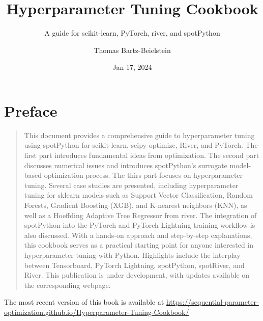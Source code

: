 \documentclass[
  letterpaper,
  DIV=11,
  numbers=noendperiod]{scrreprt}
\title{Hyperparameter Tuning Cookbook}
\subtitle{A guide for scikit-learn, PyTorch, river, and spotPython}
\author{Thomas Bartz-Beielstein}
\date{Jan 17, 2024}
\renewcommand*\contentsname{Table of contents}
\newcommand\contentsname{Table of contents}
\begin{document}
\maketitle

\renewcommand*\contentsname{Table of contents}
{
\hypersetup{linkcolor=}
\setcounter{tocdepth}{2}
\tableofcontents
}

\chapter*{Preface}\label{preface}


\begin{quote}
This document provides a comprehensive guide to hyperparameter tuning
using spotPython for scikit-learn, scipy-optimize, River, and PyTorch.
The first part introduces fundamental ideas from optimization. The
second part discusses numerical issues and introduces spotPython's
surrogate model-based optimization process. The thirs part focuses on
hyperparameter tuning. Several case studies are presented, including
hyperparameter tuning for sklearn models such as Support Vector
Classification, Random Forests, Gradient Boosting (XGB), and K-nearest
neighbors (KNN), as well as a Hoeffding Adaptive Tree Regressor from
river. The integration of spotPython into the PyTorch and PyTorch
Lightning training workflow is also discussed. With a hands-on approach
and step-by-step explanations, this cookbook serves as a practical
starting point for anyone interested in hyperparameter tuning with
Python. Highlights include the interplay between Tensorboard, PyTorch
Lightning, spotPython, spotRiver, and River. This publication is under
development, with updates available on the corresponding webpage.
\end{quote}

\begin{tcolorbox}[enhanced jigsaw, coltitle=black, bottomrule=.15mm, breakable, toprule=.15mm, colframe=quarto-callout-important-color-frame, title=\textcolor{quarto-callout-important-color}{\faExclamation}\hspace{0.5em}{Important: This book is still under development.}, colbacktitle=quarto-callout-important-color!10!white, opacityback=0, left=2mm, leftrule=.75mm, colback=white, rightrule=.15mm, bottomtitle=1mm, toptitle=1mm, titlerule=0mm, arc=.35mm, opacitybacktitle=0.6]

The most recent version of this book is available at
\url{https://sequential-parameter-optimization.github.io/Hyperparameter-Tuning-Cookbook/}

\end{tcolorbox}
\end{document}
